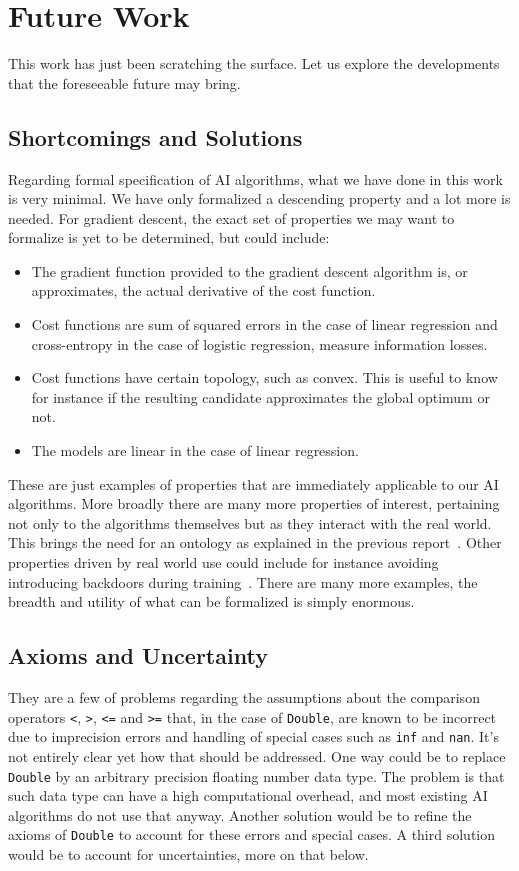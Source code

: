 \documentclass[]{report}
\begin{document}
\section{Future Work}
This work has just been scratching the surface.  Let us explore the
developments that the foreseeable future may bring.

\subsection{Shortcomings and Solutions}
Regarding formal specification of AI algorithms, what we have done in
this work is very minimal.  We have only formalized a descending
property and a lot more is needed.  For gradient descent, the exact
set of properties we may want to formalize is yet to be determined,
but could include:
\begin{itemize}
\item The gradient function provided to the gradient descent algorithm
  is, or approximates, the actual derivative of the cost function.
\item Cost functions are sum of squared errors in the case of linear
  regression and cross-entropy in the case of logistic regression,
  measure information losses.
\item Cost functions have certain topology, such as convex.  This is
  useful to know for instance if the resulting candidate approximates
  the global optimum or not.
\item The models are linear in the case of linear regression.
\end{itemize}
These are just examples of properties that are immediately applicable
to our AI algorithms.  More broadly there are many more properties of
interest, pertaining not only to the algorithms themselves but as they
interact with the real world.  This brings the need for an ontology as
explained in the previous report~\cite{AIDSLReport2021}.  Other
properties driven by real world use could include for instance
avoiding introducing backdoors during training~\cite{Menisov2022}.
There are many more examples, the breadth and utility of what can be
formalized is simply enormous.

\subsection{Axioms and Uncertainty}
They are a few of problems regarding the assumptions about the
comparison operators \texttt{<}, \texttt{>}, \texttt{<=} and
\texttt{>=} that, in the case of \texttt{Double}, are known to be
incorrect due to imprecision errors and handling of special cases such
as \texttt{inf} and \texttt{nan}.  It's not entirely clear yet how
that should be addressed.  One way could be to replace \texttt{Double}
by an arbitrary precision floating number data type.  The problem is
that such data type can have a high computational overhead, and most
existing AI algorithms do not use that anyway.  Another solution would
be to refine the axioms of \texttt{Double} to account for these errors
and special cases.  A third solution would be to account for
uncertainties, more on that below.
\end{document}
